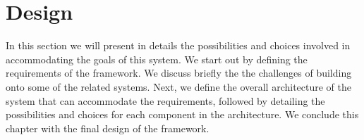 \chapter{Design}\label{ch:design}
In this section we will present in details the possibilities and choices involved in accommodating the goals of this system. We start out by defining the requirements of the framework. We discuss briefly the the challenges of building onto some of the related systems. Next, we define the overall architecture of the system that can accommodate the requirements, followed by detailing the possibilities and choices for each component in the architecture. We conclude this chapter with the final design of the framework.












